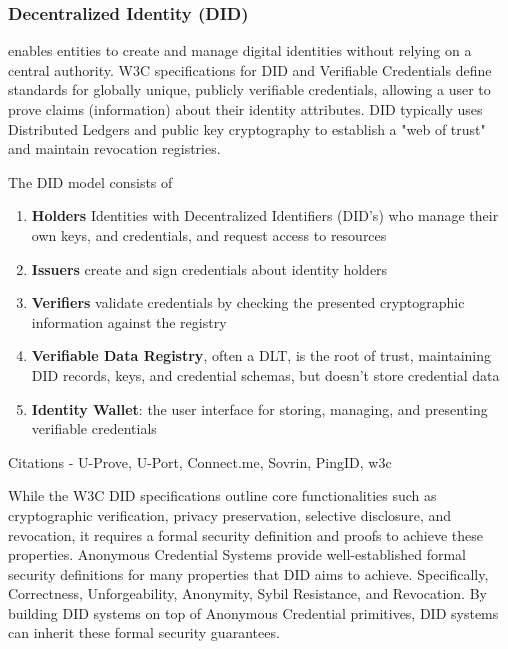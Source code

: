 \subsubsection{Decentralized Identity (DID)}
enables entities to create and manage digital identities without relying on a central authority. W3C specifications for DID and Verifiable Credentials define standards for globally unique, publicly verifiable credentials, allowing a user to prove claims (information) about their identity attributes. DID typically uses Distributed Ledgers and public key cryptography to establish a "web of trust" and maintain revocation registries. 

The DID model consists of 
\begin{enumerate}
    \item \textbf{Holders} Identities with Decentralized Identifiers (DID's) who manage their own keys, and credentials, and request access to resources
    
    \item \textbf{Issuers} create and sign credentials about identity holders
    
    \item \textbf{Verifiers} validate credentials by checking the presented cryptographic information against the registry

    \item  \textbf{Verifiable Data Registry}, often a DLT, is the root of trust, maintaining DID records, keys, and credential schemas, but doesn't store credential data
    
    \item \textbf{Identity Wallet}: the user interface for storing, managing, and presenting verifiable credentials
\end{enumerate}
 
Citations
- U-Prove, U-Port, Connect.me, Sovrin, PingID, w3c

While the W3C DID specifications outline core functionalities such as cryptographic verification, privacy preservation, selective disclosure, and revocation, it requires a formal security definition and proofs to achieve these properties. Anonymous Credential Systems provide well-established formal security definitions for many properties that DID aims to achieve. Specifically, Correctness, Unforgeability, Anonymity, Sybil Resistance, and Revocation. By building DID systems on top of Anonymous Credential primitives, DID systems can inherit these formal security guarantees. 

